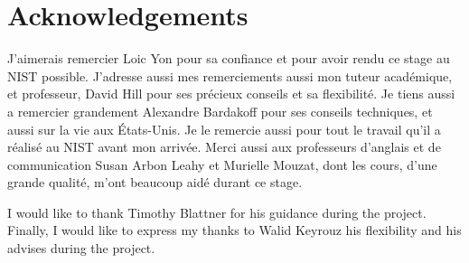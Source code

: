 
\pagestyle{empty}
\section*{Acknowledgements}

J'aimerais remercier Loic Yon pour sa confiance et pour avoir rendu ce stage au
NIST possible. J'adresse aussi mes remerciements aussi mon tuteur académique, et
professeur, David Hill pour ses précieux conseils et sa flexibilité. Je tiens
aussi a remercier grandement Alexandre Bardakoff pour ses conseils techniques,
et aussi sur la vie aux États-Unis. Je le remercie aussi pour tout le travail
qu'il a réalisé au NIST avant mon arrivée. Merci aussi aux professeurs d'anglais
et de communication Susan Arbon Leahy et Murielle Mouzat, dont les cours, d'une
grande qualité, m'ont beaucoup aidé durant ce stage.

I would like to thank Timothy Blattner for his guidance during the project.
Finally, I would like to express my thanks to Walid Keyrouz his flexibility and
his advises during the project.
